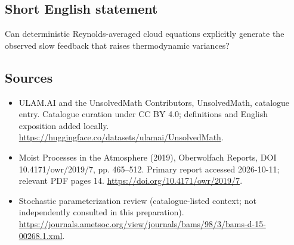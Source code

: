 \documentclass[11pt]{article}
\begin{document}
\subsection{Short English statement}
Can deterministic Reynolds-averaged cloud equations explicitly generate the observed slow feedback that raises thermodynamic variances?
\subsection{Sources}
\begin{itemize}
\item[\hypertarget{source:statement:1}{S1}] ULAM.AI and the UnsolvedMath Contributors, UnsolvedMath, catalogue entry. Catalogue curation under CC BY 4.0; definitions and English exposition added locally.
\url{https://huggingface.co/datasets/ulamai/UnsolvedMath}.
\item[\hypertarget{source:statement:2}{S2}] Moist Processes in the Atmosphere (2019), Oberwolfach Reports, DOI 10.4171/owr/2019/7, pp. 465--512. Primary report accessed 2026-10-11; relevant PDF pages 14.
\url{https://doi.org/10.4171/owr/2019/7}.
\item[\hypertarget{source:statement:3}{S3}] Stochastic parameterization review (catalogue-listed context; not independently consulted in this preparation).
\url{https://journals.ametsoc.org/view/journals/bams/98/3/bams-d-15-00268.1.xml}.
\end{itemize}
\label{end:statement}
\end{document}

